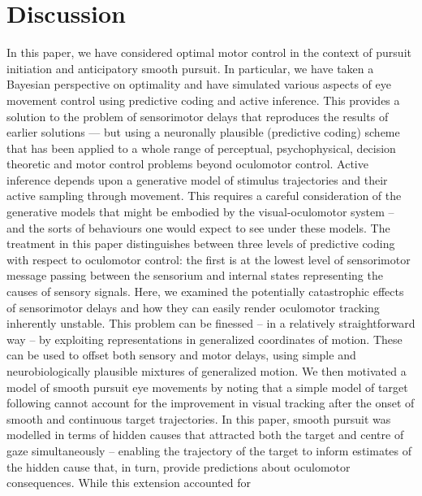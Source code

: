 \documentclass[a4paper]{article} %
\begin{document}
\section{Discussion}
In this paper, we have considered optimal motor control in the context of pursuit initiation and anticipatory smooth pursuit. In particular, we have taken a Bayesian perspective on optimality and have simulated various aspects of eye movement control using predictive coding and active inference. This provides a solution to the problem of sensorimotor delays that reproduces the results of earlier solutions --- but using a neuronally plausible (predictive coding) scheme that has been applied to a whole range of perceptual, psychophysical, decision theoretic and motor control problems beyond oculomotor control.
%
Active inference depends upon a generative model of stimulus trajectories and
their active sampling through movement. This requires a careful
consideration of the generative models that might be embodied by the
visual-oculomotor system -- and the sorts of behaviours one would expect
to see under these models. The treatment in this paper distinguishes
between three levels of predictive coding with respect to oculomotor
control: the first is at the lowest level of sensorimotor message
passing between the sensorium and internal states representing the
causes of sensory signals. Here, we examined the potentially
catastrophic effects of sensorimotor delays and how they can easily
render oculomotor tracking inherently unstable. This problem can be
finessed -- in a relatively straightforward way -- by exploiting
representations in generalized coordinates of motion. These can be used
to offset both sensory and motor delays, using simple and
neurobiologically plausible mixtures of generalized motion. We then
motivated a model of smooth pursuit eye movements by noting that a
simple model of target following cannot account for the improvement in
visual tracking after the onset of smooth and continuous target
trajectories. In this paper, smooth pursuit was modelled in terms of
hidden causes that attracted both the target and centre of gaze
simultaneously -- enabling the trajectory of the target to inform
estimates of the hidden cause that, in turn, provide predictions about
oculomotor consequences. While this extension accounted for
\end{document}
